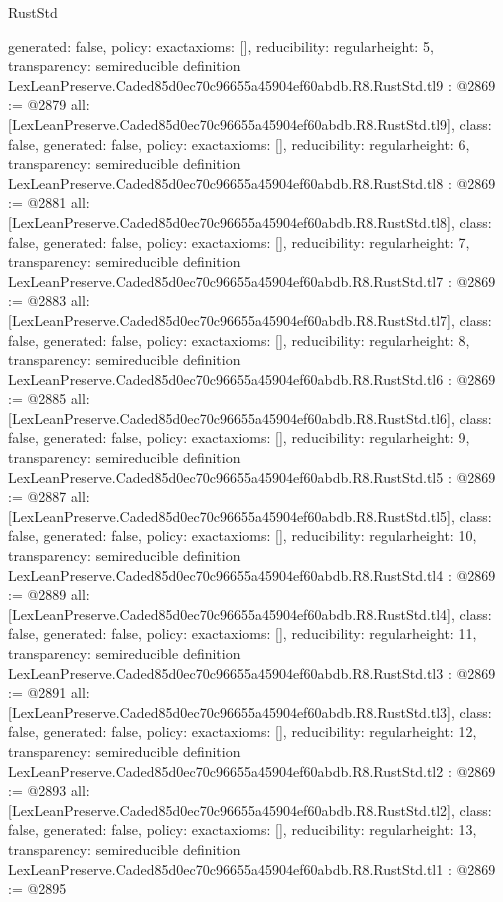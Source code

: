 \begin{lexlean}{RustStd}
\begin{coremodule}
{  generated: false,
  policy: exact{axioms: []},
  reducibility: regular{height: 5},
  transparency: semireducible
}
definition LexLeanPreserve.Caded85d0ec70c96655a45904ef60abdb.R8.RustStd.tl9 : @2869 := @2879 {
  all: [LexLeanPreserve.Caded85d0ec70c96655a45904ef60abdb.R8.RustStd.tl9],
  class: false,
  generated: false,
  policy: exact{axioms: []},
  reducibility: regular{height: 6},
  transparency: semireducible
}
definition LexLeanPreserve.Caded85d0ec70c96655a45904ef60abdb.R8.RustStd.tl8 : @2869 := @2881 {
  all: [LexLeanPreserve.Caded85d0ec70c96655a45904ef60abdb.R8.RustStd.tl8],
  class: false,
  generated: false,
  policy: exact{axioms: []},
  reducibility: regular{height: 7},
  transparency: semireducible
}
definition LexLeanPreserve.Caded85d0ec70c96655a45904ef60abdb.R8.RustStd.tl7 : @2869 := @2883 {
  all: [LexLeanPreserve.Caded85d0ec70c96655a45904ef60abdb.R8.RustStd.tl7],
  class: false,
  generated: false,
  policy: exact{axioms: []},
  reducibility: regular{height: 8},
  transparency: semireducible
}
definition LexLeanPreserve.Caded85d0ec70c96655a45904ef60abdb.R8.RustStd.tl6 : @2869 := @2885 {
  all: [LexLeanPreserve.Caded85d0ec70c96655a45904ef60abdb.R8.RustStd.tl6],
  class: false,
  generated: false,
  policy: exact{axioms: []},
  reducibility: regular{height: 9},
  transparency: semireducible
}
definition LexLeanPreserve.Caded85d0ec70c96655a45904ef60abdb.R8.RustStd.tl5 : @2869 := @2887 {
  all: [LexLeanPreserve.Caded85d0ec70c96655a45904ef60abdb.R8.RustStd.tl5],
  class: false,
  generated: false,
  policy: exact{axioms: []},
  reducibility: regular{height: 10},
  transparency: semireducible
}
definition LexLeanPreserve.Caded85d0ec70c96655a45904ef60abdb.R8.RustStd.tl4 : @2869 := @2889 {
  all: [LexLeanPreserve.Caded85d0ec70c96655a45904ef60abdb.R8.RustStd.tl4],
  class: false,
  generated: false,
  policy: exact{axioms: []},
  reducibility: regular{height: 11},
  transparency: semireducible
}
definition LexLeanPreserve.Caded85d0ec70c96655a45904ef60abdb.R8.RustStd.tl3 : @2869 := @2891 {
  all: [LexLeanPreserve.Caded85d0ec70c96655a45904ef60abdb.R8.RustStd.tl3],
  class: false,
  generated: false,
  policy: exact{axioms: []},
  reducibility: regular{height: 12},
  transparency: semireducible
}
definition LexLeanPreserve.Caded85d0ec70c96655a45904ef60abdb.R8.RustStd.tl2 : @2869 := @2893 {
  all: [LexLeanPreserve.Caded85d0ec70c96655a45904ef60abdb.R8.RustStd.tl2],
  class: false,
  generated: false,
  policy: exact{axioms: []},
  reducibility: regular{height: 13},
  transparency: semireducible
}
definition LexLeanPreserve.Caded85d0ec70c96655a45904ef60abdb.R8.RustStd.tl1 : @2869 := @2895 {
}
\end{coremodule}
\end{lexlean}
